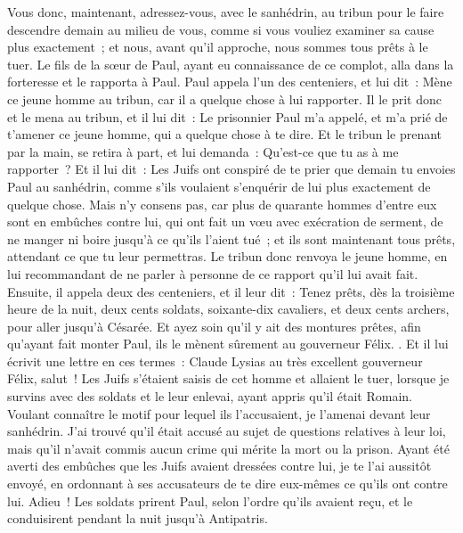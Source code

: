 \begin{multicols}{2}
Vous donc, maintenant, adressez-vous, avec le sanhédrin, au tribun pour le faire descendre demain au milieu de vous, comme si vous vouliez examiner sa cause plus exactement~; et nous, avant qu'il approche, nous sommes tous prêts à le tuer.
Le fils de la sœur de Paul, ayant eu connaissance de ce complot, alla dans la forteresse et le rapporta à Paul.
Paul appela l'un des centeniers, et lui dit~: Mène ce jeune homme au tribun, car il a quelque chose à lui rapporter.
Il le prit donc et le mena au tribun, et il lui dit~: Le prisonnier Paul m'a appelé, et m'a prié de t'amener ce jeune homme, qui a quelque chose à te dire.
Et le tribun le prenant par la main, se retira à part, et lui demanda~: Qu'est-ce que tu as à me rapporter~?
Et il lui dit~: Les Juifs ont conspiré de te prier que demain tu envoies Paul au sanhédrin, comme s'ils voulaient s'enquérir de lui plus exactement de quelque chose.
Mais n'y consens pas, car plus de quarante hommes d'entre eux sont en embûches contre lui, qui ont fait un vœu avec exécration de serment, de ne manger ni boire jusqu'à ce qu'ils l'aient tué~; et ils sont maintenant tous prêts, attendant ce que tu leur permettras.
Le tribun donc renvoya le jeune homme, en lui recommandant de ne parler à personne de ce rapport qu'il lui avait fait.
Ensuite, il appela deux des centeniers, et il leur dit~: Tenez prêts, dès la troisième heure de la nuit, deux cents soldats, soixante-dix cavaliers, et deux cents archers, pour aller jusqu'à Césarée.
Et ayez soin qu'il y ait des montures prêtes, afin qu'ayant fait monter Paul, ils le mènent sûrement au gouverneur Félix. .
Et il lui écrivit une lettre en ces termes~:
Claude Lysias au très excellent gouverneur Félix, salut~!
Les Juifs s'étaient saisis de cet homme et allaient le tuer, lorsque je survins avec des soldats et le leur enlevai, ayant appris qu'il était Romain.
Voulant connaître le motif pour lequel ils l'accusaient, je l'amenai devant leur sanhédrin.
J'ai trouvé qu'il était accusé au sujet de questions relatives à leur loi, mais qu'il n'avait commis aucun crime qui mérite la mort ou la prison.
Ayant été averti des embûches que les Juifs avaient dressées contre lui, je te l'ai aussitôt envoyé, en ordonnant à ses accusateurs de te dire eux-mêmes ce qu'ils ont contre lui. Adieu~!
Les soldats prirent Paul, selon l'ordre qu'ils avaient reçu, et le conduisirent pendant la nuit jusqu'à Antipatris.

\end{multicols}
